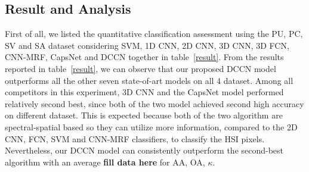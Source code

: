 \documentclass{article}
\begin{document}
	\subsection{Result and Analysis}\label{subsec:result-and-analysis}
	First of all, we listed the quantitative classification assessment using the PU, PC, SV and SA dataset considering
	SVM,
	1D CNN\cite{hu2015deep},
	2D CNN\cite{sharma2016hyperspectral},
	3D CNN\cite{hamida20183},
	3D FCN\cite{lee2016contextual},
	CNN-MRF\cite{cao2018hyperspectral},
	CapsNet and DCCN together in table~\ref{result}.
	From the results reported in table~\ref{result}, we can observe that our proposed DCCN model outperforms all the
	other seven state-of-art models on all 4 dataset.
	Among all competitors in this experiment, 3D CNN\cite{hamida20183} and the CapsNet model performed relatively second
	best, since both of the two model achieved second high accuracy on different dataset.
	This is expected because both of the two algorithm are spectral-spatial based so they can utilize more information,
	compared to the 2D CNN, FCN, SVM and CNN-MRF classifiers, to classify the HSI pixels.
	Nevertheless, our DCCN model can consistently outperform the second-best algorithm with an average \textbf{fill data
	here} for AA, OA, $\kappa$.
\end{document}
